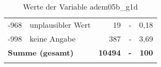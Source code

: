 \begin{longtable}{Xlrrr}
       -968 & unplausibler Wert & 19 & - & 0,18 \\

       -998 & keine Angabe & 387 & - & 3,69 \\

     \midrule
     \multicolumn{2}{l}{\textbf{Summe (gesamt)}} & \textbf{10494} & \textbf{-} & \textbf{100} \\
     \bottomrule
     \caption{Werte der Variable adem05b\_g1d}
     \end{longtable}
     
